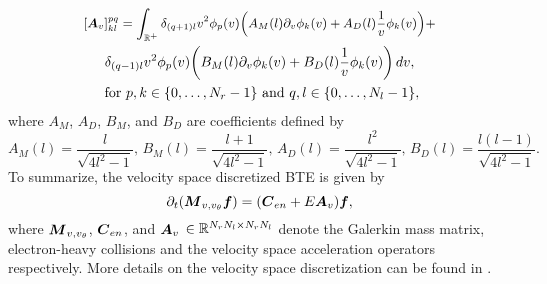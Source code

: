 \begin{multline}
	\small
	[\vect A_v]^{pq}_{kl} = \int_{\reals^+}  
		\delta_{(q+1) l} v^2 \phi_p\of{v} \of{A_M\of{l} \partial_v\phi_k\of{v} + A_D\of{l}\frac{1}{v} \phi_k\of{v}} + \\
		\delta_{(q-1) l} v^2 \phi_p\of{v} \of{B_M\of{l} \partial_v\phi_k\of{v} + B_D\of{l}\frac{1}{v} \phi_k\of{v}} 
	 \diff{v}, \\
	 \text{ for } p,k \in \{0,\hdots, N_r-1\} \text{ and } q,l \in \{0, \hdots,  N_l-1\} \label{eq:adv_v_ws},
\end{multline} where $A_M$, $A_D$, $B_M$, and $B_D$ are coefficients defined by
\begin{equation}
A_M(l) = \frac{l}{\sqrt{4l^2-1}}\text{, } B_M(l) = \frac{l+1}{\sqrt{4l^2-1}}\text{, } A_D(l) = \frac{l^2}{\sqrt{4l^2-1}}\text{, } B_D(l) = \frac{l(l-1)}{\sqrt{4l^2-1}}. 	
\end{equation}
To summarize, the velocity space discretized BTE is given by
\begin{equation}
	\partial_t \of{\vect M_{v,\vtheta} \vect f} = \of{\vect{C}_{en} + E \vect A_v}\vect{f} \label{eq:discretized_bte_vspace},
\end{equation} where $\boldsymbol{M}_{v,{v_{\theta}}}$, $\boldsymbol{C}_{en}$, and $\boldsymbol{A}_v$ $\in \mathbb{R}^{N_rN_l \times N_rN_l} $ denote the Galerkin mass matrix, electron-heavy collisions and the velocity space acceleration operators respectively. More details on the velocity space discretization can be found in \cite{fernando0DBTE}. 

